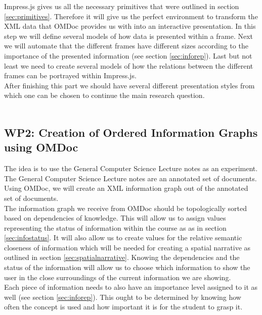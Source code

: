 \documentclass[twoside, 12pt]{article}
\begin{document}
Impress.js gives us all the necessary primitives that were outlined in section \ref{sec:primitives}. Therefore it will give us the perfect environment to transform the XML data that OMDoc provides us with into an interactive presentation. In this step we will define several models of how data is presented within a frame. Next we will automate that the different frames have different sizes according to the importance of the presented information (see section \ref{sec:inforep}). Last but not least we need to create several models of how the relations between the different frames can be portrayed within Impress.js.\\

After finishing this part we should have several different presentation styles from which one can be chosen to continue the main research question.\\ 

\\

\subsection{WP2: Creation of Ordered Information Graphs using OMDoc}
\label{sec:wp2}

The idea is to use the General Computer Science Lecture notes \cite{Kohlhase:GenCSI:base} as an experiment. The General Computer Science Lecture notes are an annotated set of documents. Using OMDoc, we will create an XML information graph out of the annotated set of documents.\\

The information graph we receive from OMDoc should be topologically sorted based on dependencies of knowledge. This will allow us to assign values representing the status of information within the course as as in section \ref{sec:infostatus}. It will also allow us to create values for the relative semantic closeness of information which will be needed for creating a spatial narrative as outlined in section \ref{sec:spatialnarrative}. Knowing the dependencies and the status of the information will allow us to choose which information to show the user in the close surroundings of the current information we are showing.\\

Each piece of information needs to also have an importance level assigned to it as well (see section \ref{sec:inforep}). This ought to be determined by knowing how often the concept is used and how important it is for the student to grasp it.\\
\end{document}
